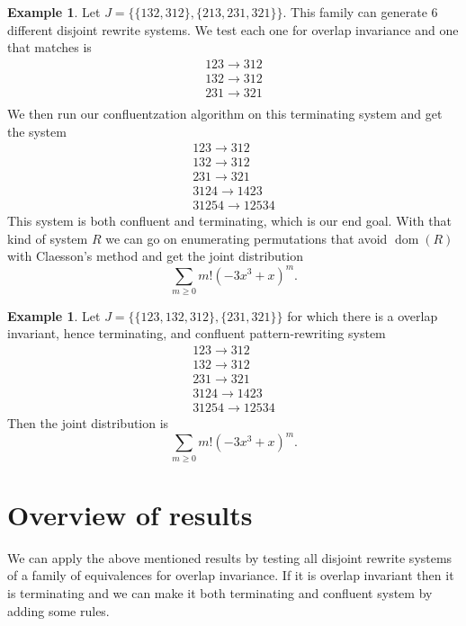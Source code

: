 \documentclass[a4paper, 11pt, english]{article}
\newcommand{\patternrule}{ \to \!}
\theoremstyle{definition}
\newtheorem{example}[theorem]{Example}
\DeclareMathOperator{\dom}{dom}
\begin{document}
\begin{example}
Let $J=\{\{ 132, 312 \}, \{ 213, 231, 321 \}\}$. This family can generate 6
different disjoint rewrite systems. We test each one for overlap invariance and one that
matches is 
\[
    \begin{matrix}
        123 \patternrule 312 \\
        132 \patternrule 312 \\
        231 \patternrule 321 \\
    \end{matrix}
\]
We then run our confluentzation algorithm on this terminating system
and get the system
\[
    \begin{matrix}
        123 \patternrule 312 \\
        132 \patternrule 312 \\
        231 \patternrule 321 \\
        3124 \patternrule 1423 \\
        31254 \patternrule 12534
    \end{matrix}
\]
This system is both confluent and terminating, which is our end goal.
With that kind of system $R$ we can go on enumerating
permutations that avoid $\dom(R)$ with Claesson's method and get the joint distribution
\[
  \sum_{m \geq 0} m! (-3x^3 + x)^m.
\]
 
\end{example}

\begin{example}
Let $J = \{ \{ 123, 132, 312 \}, \{ 231, 321 \} \}$ for which there is a overlap invariant, hence
terminating, and confluent pattern-rewriting system
\[
    \begin{matrix}
        123 \patternrule 312 \\
        132 \patternrule 312 \\
        231 \patternrule 321 \\
        3124 \patternrule 1423 \\
        31254 \patternrule 12534
    \end{matrix}
\]
Then the joint distribution is
\[
  \sum_{m \geq 0} m! (-3x^3 + x)^m.
\]

\end{example}

\section{Overview of results}
We can apply the above mentioned results by testing all disjoint rewrite systems of a
family of equivalences for overlap invariance. If it is overlap invariant then it is terminating and
we can make it both terminating and confluent system by adding some rules.
\end{document}
